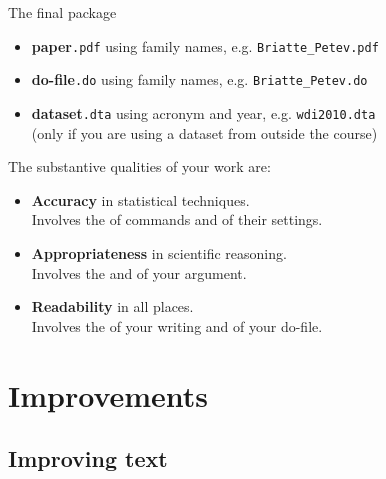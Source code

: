 \documentclass[t]{beamer}
\begin{document}
	\begin{frame}[t]{The final package}

		\begin{itemize}
			\item \textbf{paper}\texttt{.pdf} using family names, e.g. \texttt{Briatte\_Petev.pdf}
			\item \textbf{do-file}\texttt{.do} using family names, e.g. \texttt{Briatte\_Petev.do}
			\item \textbf{dataset}\texttt{.dta} using acronym and year, e.g. \texttt{wdi2010.dta}\\[.5em] (only if you are using a dataset from outside the course)
		\end{itemize}
				
		The substantive qualities of your work are:
		
		\begin{itemize}
			\item \textbf{Accuracy} in statistical techniques.\\
			Involves the  of commands and  of their settings.
			\item \textbf{Appropriateness} in scientific reasoning.\\
			Involves the  and  of your argument.
			\item \textbf{Readability} in all places.\\
			Involves the  of your writing and  of your do-file.
		\end{itemize}
	\end{frame}

	\section{Improvements}

	\subsection{Improving text}
	
\end{document}

